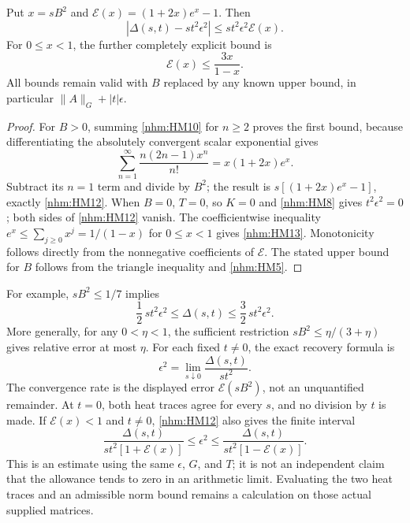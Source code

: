 \documentclass[11pt]{article}
\begin{document}
\begin{nhmtheorem}
Put \(x=sB^2\) and \(\mathcal E(x)=(1+2x)e^x-1\). Then
\begin{equation}
 \left|\Delta(s,t)-s t^2\epsilon^2\right|
 \le s t^2\epsilon^2\mathcal E(x).
 \tag{HM12}\label{nhm:HM12}
\end{equation}
For \(0\le x<1\), the further completely explicit bound is
\begin{equation}
 \mathcal E(x)\le\frac{3x}{1-x}.
 \tag{HM13}\label{nhm:HM13}
\end{equation}
All bounds remain valid with \(B\) replaced by any known upper bound, in
particular \(\|A\|_G+|t|\epsilon\).
\end{nhmtheorem}
\begin{proof}
For \(B>0\), summing \eqref{nhm:HM10} for \(n\ge2\) proves the first bound,
because differentiating the absolutely convergent scalar exponential gives
\[
 \sum_{n=1}^{\infty}\frac{n(2n-1)x^n}{n!}
   =x(1+2x)e^x.
\]
Subtract its \(n=1\) term and divide by \(B^2\); the result is
\(s[(1+2x)e^x-1]\), exactly \eqref{nhm:HM12}.
When \(B=0\), \(T=0\), so \(K=0\) and \eqref{nhm:HM8} gives
\(t^2\epsilon^2=0\); both sides of \eqref{nhm:HM12} vanish.
The coefficientwise inequality \(e^x\le\sum_{j\ge0}x^j=1/(1-x)\)
for \(0\le x<1\) gives \eqref{nhm:HM13}. Monotonicity follows directly from
the nonnegative coefficients of \(\mathcal E\). The stated upper bound
for \(B\) follows from the triangle inequality and \eqref{nhm:HM5}.
\end{proof}

For example, \(sB^2\le1/7\) implies
\begin{equation}
 \frac12\,s t^2\epsilon^2\le\Delta(s,t)
       \le\frac32\,s t^2\epsilon^2.
 \tag{HM14}\label{nhm:HM14}
\end{equation}
More generally, for any \(0<\eta<1\), the sufficient restriction
\(sB^2\le\eta/(3+\eta)\) gives relative error at most \(\eta\).
For each fixed \(t\ne0\), the exact recovery formula is
\begin{equation}
 \epsilon^2=\lim_{s\downarrow0}\frac{\Delta(s,t)}{s t^2}.
 \tag{HM15}\label{nhm:HM15}
\end{equation}
The convergence rate is the displayed error \(\mathcal E(sB^2)\), not an
unquantified remainder. At \(t=0\), both heat traces agree for every \(s\),
and no division by \(t\) is made. If \(\mathcal E(x)<1\) and \(t\ne0\),
\eqref{nhm:HM12} also gives the finite interval
\begin{equation}
 \frac{\Delta(s,t)}{s t^2[1+\mathcal E(x)]}
 \le\epsilon^2\le
 \frac{\Delta(s,t)}{s t^2[1-\mathcal E(x)]}.
 \tag{HM16}\label{nhm:HM16}
\end{equation}
This is an estimate using the same \(\epsilon\), \(G\), and \(T\); it is
not an independent claim that the allowance tends to zero in an arithmetic
limit. Evaluating the two heat traces and an admissible norm bound remains
a calculation on those actual supplied matrices.
\end{document}
